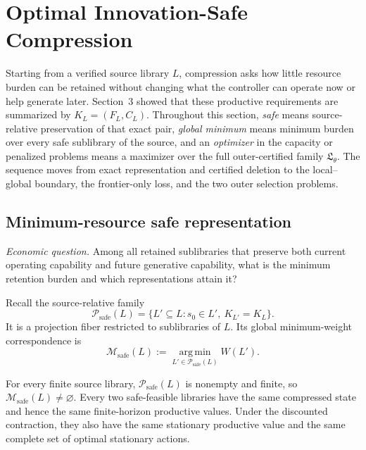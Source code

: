 \section{Optimal Innovation-Safe Compression}
\label{sec:compression}

Starting from a verified source library \(L\), compression asks how little
resource burden can be retained without changing what the controller can
operate now or help generate later.  Section~3 showed that these productive
requirements are summarized by \(K_L=(F_L,C_L)\).  Throughout this section,
\emph{safe} means source-relative preservation of that exact pair,
\emph{global minimum} means minimum burden over every safe sublibrary of the
source, and an \emph{optimizer} in the capacity or penalized problems means a
maximizer over the full outer-certified family \(\mathfrak L_\theta\).  The
sequence moves from exact representation and certified deletion to the
local--global boundary, the frontier-only loss, and the two outer selection
problems.

\subsection{Minimum-resource safe representation}

\emph{Economic question.}  Among all retained sublibraries that preserve both
current operating capability and future generative capability, what is the
minimum retention burden and which representations attain it?

Recall the source-relative family
\[
 \mathcal P_{\mathrm{safe}}(L)
 =\{L'\subseteq L:s_0\in L',\ K_{L'}=K_L\}.
\]
It is a projection fiber restricted to sublibraries of \(L\).  Its global
minimum-weight correspondence is
\begin{equation}\label{eq:global-safe-optimizer}
 \mathcal M_{\mathrm{safe}}(L)
 :=\operatorname*{arg\,min}_{L'\in\mathcal P_{\mathrm{safe}}(L)}W(L').
\end{equation}

\begin{theorem}
\label{thm:minimum-safe-compression}
For every finite source library, \(\mathcal P_{\mathrm{safe}}(L)\) is
nonempty and finite, so \(\mathcal M_{\mathrm{safe}}(L)\ne\varnothing\).
Every two safe-feasible libraries have the same compressed state and hence
the same finite-horizon productive values.  Under the discounted contraction,
they also have the same stationary productive value and the same complete set
of optimal stationary actions.
\end{theorem}

